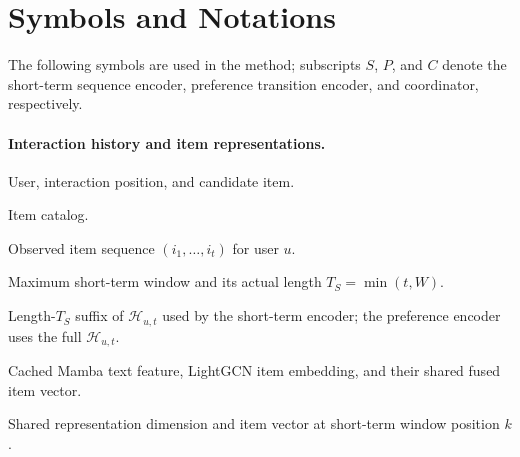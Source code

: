 \documentclass[11pt]{article}
\begin{document}

\appendix
\section{Symbols and Notations}
\label{app:notations}
The following symbols are used in the method; subscripts $S$, $P$, and $C$ denote the short-term sequence encoder, preference transition encoder, and coordinator, respectively.

\paragraph{Interaction history and item representations.}
\begin{description}[leftmargin=2.4cm,labelwidth=2.1cm,itemsep=0pt]
\item[$u,t,i$] User, interaction position, and candidate item.
\item[$\mathcal I$] Item catalog.
\item[$\mathcal H_{u,t}$] Observed item sequence $(i_1,\ldots,i_t)$ for user $u$.
\item[$W,T_S$] Maximum short-term window and its actual length $T_S=\min(t,W)$.
\item[$\mathcal R_{u,t}^{(W)}$] Length-$T_S$ suffix of $\mathcal H_{u,t}$ used by the short-term encoder; the preference encoder uses the full $\mathcal H_{u,t}$.
\item[$f_i,g_i,e_i$] Cached Mamba text feature, LightGCN item embedding, and their shared fused item vector.
\item[$d,x_k$] Shared representation dimension and item vector at short-term window position $k$.
\end{description}
\end{document}
